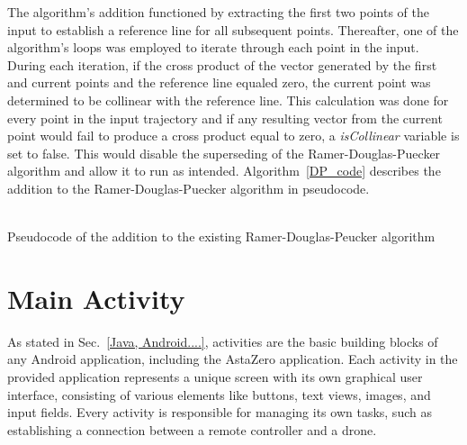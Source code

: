 The algorithm's addition functioned by extracting the first two points of the input to establish a reference line for all subsequent points. Thereafter, one of the algorithm's loops was employed to iterate through each point in the input. During each iteration, if the cross product of the vector generated by the first and current points and the reference line equaled zero, the current point was determined to be collinear with the reference line. This calculation was done for every point in the input trajectory and if any resulting vector from the current point would fail to produce a cross product equal to zero, a \textit{isCollinear} variable is set to false. This would disable the superseding of the Ramer-Douglas-Puecker algorithm and allow it to run as intended. Algorithm~\ref{DP_code} describes the addition to the Ramer-Douglas-Puecker algorithm in pseudocode. 
\\ \\
\begin{algorithm}[H]
\caption{Pseudocode of the addition to the existing Ramer-Douglas-Peucker algorithm}\label{DP_code}
\SetAlgoLined
{}
\end{algorithm}


\section{Main Activity} \label{sec:chalmers_demo_activity}
As stated in Sec.~\ref{Java, Android....}, activities are the basic building blocks of any Android application, including the AstaZero application. Each activity in the provided application represents a unique screen with its own graphical user interface, consisting of various elements like buttons, text views, images, and input fields. Every activity is responsible for managing its own tasks, such as establishing a connection between a remote controller and a drone. 
\\

